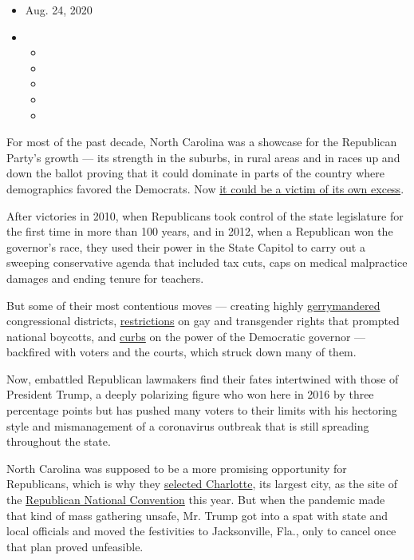 \begin{itemize}
\item
  Aug. 24, 2020
\item
  \begin{itemize}
  \item
  \item
  \item
  \item
  \item
  \end{itemize}
\end{itemize}

For most of the past decade, North Carolina was a showcase for the
Republican Party's growth --- its strength in the suburbs, in rural
areas and in races up and down the ballot proving that it could dominate
in parts of the country where demographics favored the Democrats. Now
\href{https://www.nytimes3xbfgragh.onion/2020/08/24/us/politics/north-carolina-charlotte-rnc.html}{it
could be a victim of its own excess}.

After victories in 2010, when Republicans took control of the state
legislature for the first time in more than 100 years, and in 2012, when
a Republican won the governor's race, they used their power in the State
Capitol to carry out a sweeping conservative agenda that included tax
cuts, caps on medical malpractice damages and ending tenure for
teachers.

But some of their most contentious moves --- creating highly
\href{https://www.nytimes3xbfgragh.onion/interactive/2018/11/29/us/politics/north-carolina-gerrymandering.html}{gerrymandered}
congressional districts,
\href{https://www.nytimes3xbfgragh.onion/2016/03/25/us/north-carolina-law-antidiscrimination-pat-mccrory.html}{restrictions}
on gay and transgender rights that prompted national boycotts, and
\href{https://www.nytimes3xbfgragh.onion/2016/12/16/us/pat-mccrory-roy-cooper-north-carolina.html}{curbs}
on the power of the Democratic governor --- backfired with voters and
the courts, which struck down many of them.

Now, embattled Republican lawmakers find their fates intertwined with
those of President Trump, a deeply polarizing figure who won here in
2016 by three percentage points but has pushed many voters to their
limits with his hectoring style and mismanagement of a coronavirus
outbreak that is still spreading throughout the state.

North Carolina was supposed to be a more promising opportunity for
Republicans, which is why they
\href{https://www.nytimes3xbfgragh.onion/2018/07/20/us/politics/republican-2020-convention-charlotte.html}{selected
Charlotte}, its largest city, as the site of the
\href{https://www.nytimes3xbfgragh.onion/2020/08/25/us/politics/how-to-watch-republican-convention.html}{Republican
National Convention} this year. But when the pandemic made that kind of
mass gathering unsafe, Mr. Trump got into a spat with state and local
officials and moved the festivities to Jacksonville, Fla., only to
cancel once that plan proved unfeasible.

